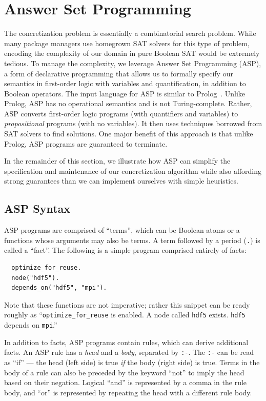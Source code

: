 \section{Answer Set Programming}
\label{sec:asp}

The concretization problem is essentially a combinatorial search problem. While many
package managers use homegrown SAT solvers for this type of problem, encoding the
complexity of our domain in pure Boolean SAT would be extremely tedious. To manage the
complexity, we leverage Answer Set Programming (ASP), a form of declarative programming
that allows us to formally specify our semantics in first-order logic with variables and
quantification, in addition to Boolean operators. The input language for ASP is similar
to Prolog~\cite{baral_2003}. Unlike Prolog, ASP has no operational semantics and is not
Turing-complete. Rather, ASP converts first-order logic programs (with quantifiers and
variables) to {\it propositional} programs (with no variables). It then uses techniques
borrowed from SAT solvers to find solutions. One major benefit of this approach is that
unlike Prolog, ASP programs are guaranteed to terminate.

In the remainder of this section, we illustrate how ASP can simplify the specification
and maintenance of our concretization algorithm while also affording strong guarantees
than we can implement ourselves with simple heuristics.

\subsection{ASP Syntax}

ASP programs are comprised of ``terms'', which can be Boolean atoms or a functions whose
arguments may also be terms. A term followed by a period ({\tt .}) is called a ``fact''.
The following is a simple program comprised entirely of facts:
\begin{verbatim}
  optimize_for_reuse.
  node("hdf5").
  depends_on("hdf5", "mpi").
\end{verbatim}
Note that these functions are not imperative; rather this snippet can be ready roughly
as ``{\tt optimize\_for\_reuse} is enabled. A node called {\tt hdf5} exists. {\tt hdf5} depends on {\tt mpi}.''

In addition to facts, ASP programs contain rules, which can derive additional facts. An
ASP rule has a {\it head} and a {\it body}, separated by \texttt{:-}. The \texttt{:-}
can be read as ``if'' --- the head (left side) is true {\it if} the body (right side) is true.
Terms in the body of a rule can also be preceded by the keyword ``not'' to imply the
head based on their negation. Logical ``and'' is represented by a comma in the rule
body, and ``or'' is represented by repeating the head with a different rule body.

